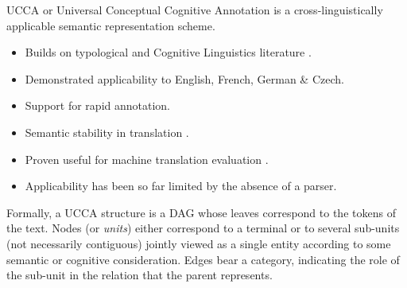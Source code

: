 \documentclass[a0,portrait]{a0poster}
\begin{document}
\begin{multicols}{2}
UCCA or Universal Conceptual Cognitive Annotation \cite{abend2013universal}
is a cross-linguistically applicable semantic representation scheme.
\begin{itemize}
 \item Builds on typological \cite{Dixon:basic}
 	and Cognitive Linguistics literature \cite{croft2004cognitive}.
 \item Demonstrated applicability to English, French, German \& Czech.
 \item Support for rapid annotation.
 \item Semantic stability in translation \cite{sulem2015conceptual}.
 \item Proven useful for machine translation evaluation \cite{birch2016hume}.
 \item Applicability has been so far limited by the absence of a parser.
\end{itemize}

Formally, a UCCA structure is a DAG whose leaves correspond to the tokens of
the text. Nodes (or {\it units}) either correspond to a terminal or
to several sub-units (not necessarily contiguous) jointly viewed as a
single entity according to some semantic or cognitive consideration.
Edges bear a category, indicating the role of the sub-unit in the relation
that the parent represents.


\end{multicols}
\end{document}
